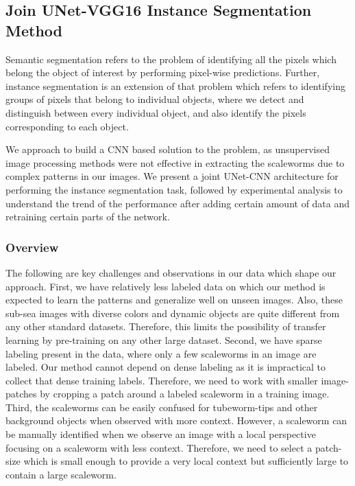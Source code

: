 \documentclass[10pt,twocolumn,letterpaper]{article}
\begin{document}
\subsection{Join UNet-VGG16 Instance Segmentation Method} \label{section:inferencepipeline}
Semantic segmentation refers to the problem of identifying all the pixels which belong the object of interest by performing pixel-wise predictions. Further, instance segmentation is an extension of that problem which refers to identifying groups of pixels that belong to individual objects, where we detect and distinguish between every individual object, and also identify the pixels corresponding to each object.

We approach to build a CNN based solution to the problem, as unsupervised image processing methods were not effective in extracting the scaleworms due to complex patterns in our images. We present a joint UNet-CNN architecture for performing the instance segmentation task, followed by experimental analysis to understand the trend of the performance after adding certain amount of data and retraining certain parts of the network.

\subsubsection{Overview}
The following are key challenges and observations in our data which shape our approach.
First, we have relatively less labeled data on which our method is expected to learn the patterns and generalize well on unseen images. Also, these sub-sea images with diverse colors and dynamic objects are quite different from any other standard datasets. Therefore, this limits the possibility of transfer learning by pre-training on any other large dataset.
Second, we have sparse labeling present in the data, where only a few scaleworms in an image are labeled. Our method cannot depend on dense labeling as it is impractical to collect that dense training labels. Therefore, we need to work with smaller image-patches by cropping a patch around a labeled scaleworm in a training image.
Third, the scaleworms can be easily confused for tubeworm-tips and other background objects when observed with more context. However, a scaleworm can be manually identified when we observe an image with a local perspective focusing on a scaleworm with less context. Therefore, we need to select a patch-size which is small enough to provide a very local context but sufficiently large to contain a large scaleworm.
\end{document}

